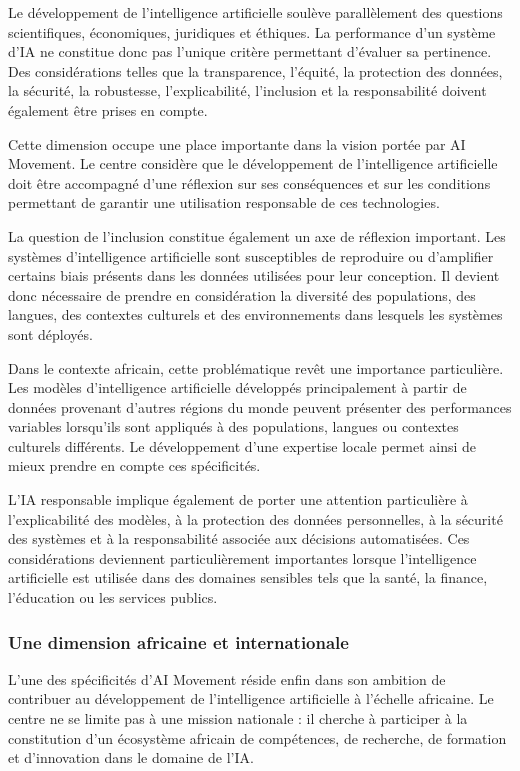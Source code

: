 \documentclass[12pt,a4paper]{report}
\begin{document}
Le développement de l'intelligence artificielle soulève parallèlement des questions scientifiques, économiques, juridiques et éthiques. La performance d'un système d'IA ne constitue donc pas l'unique critère permettant d'évaluer sa pertinence. Des considérations telles que la transparence, l'équité, la protection des données, la sécurité, la robustesse, l'explicabilité, l'inclusion et la responsabilité doivent également être prises en compte.

Cette dimension occupe une place importante dans la vision portée par AI Movement. Le centre considère que le développement de l'intelligence artificielle doit être accompagné d'une réflexion sur ses conséquences et sur les conditions permettant de garantir une utilisation responsable de ces technologies.

La question de l'inclusion constitue également un axe de réflexion important. Les systèmes d'intelligence artificielle sont susceptibles de reproduire ou d'amplifier certains biais présents dans les données utilisées pour leur conception. Il devient donc nécessaire de prendre en considération la diversité des populations, des langues, des contextes culturels et des environnements dans lesquels les systèmes sont déployés.

Dans le contexte africain, cette problématique revêt une importance particulière. Les modèles d'intelligence artificielle développés principalement à partir de données provenant d'autres régions du monde peuvent présenter des performances variables lorsqu'ils sont appliqués à des populations, langues ou contextes culturels différents. Le développement d'une expertise locale permet ainsi de mieux prendre en compte ces spécificités.

L'IA responsable implique également de porter une attention particulière à l'explicabilité des modèles, à la protection des données personnelles, à la sécurité des systèmes et à la responsabilité associée aux décisions automatisées. Ces considérations deviennent particulièrement importantes lorsque l'intelligence artificielle est utilisée dans des domaines sensibles tels que la santé, la finance, l'éducation ou les services publics.

\subsubsection{Une dimension africaine et internationale}

L'une des spécificités d'AI Movement réside enfin dans son ambition de contribuer au développement de l'intelligence artificielle à l'échelle africaine. Le centre ne se limite pas à une mission nationale : il cherche à participer à la constitution d'un écosystème africain de compétences, de recherche, de formation et d'innovation dans le domaine de l'IA.
\end{document}
